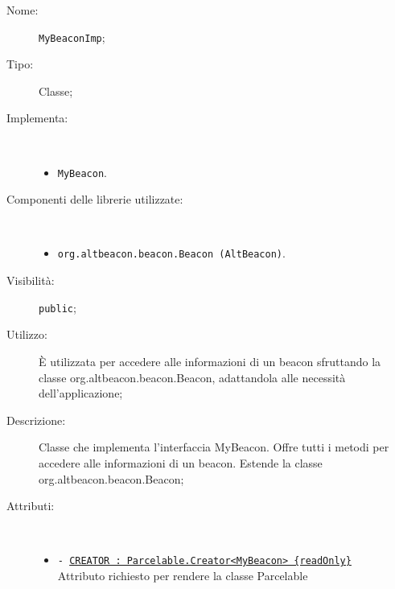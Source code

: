 \documentclass[../DefinizioneDiProdotto.tex]{subfiles}
\begin{document}
\begin{description}
	\item[Nome:] \texttt{MyBeaconImp};
	\item[Tipo:] Classe;
	\item[Implementa:] \
	\begin{itemize}
		\item \texttt{MyBeacon}.
		
	\end{itemize}
	\item[Componenti delle librerie utilizzate:] \
	\begin{itemize}
		\item \texttt{org.altbeacon.beacon.Beacon (AltBeacon)}.
		
	\end{itemize}
	\item[Visibilità:] \texttt{public};
	\item[Utilizzo:] È utilizzata per accedere alle informazioni di un beacon sfruttando la classe org.altbeacon.beacon.Beacon, adattandola alle necessità dell'applicazione;
	\item[Descrizione:] Classe che implementa l'interfaccia MyBeacon. Offre tutti i metodi per accedere alle informazioni di un beacon. Estende la classe org.altbeacon.beacon.Beacon;
	\item[Attributi:] \
	\begin{itemize}
		\item \texttt{- \underline{CREATOR : Parcelable.Creator<MyBeacon> \{readOnly\}}}\\
		Attributo richiesto per rendere la classe Parcelable
		

\end{itemize}
\end{description}
\end{document}

